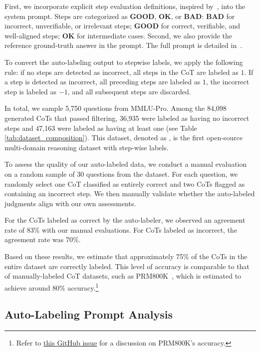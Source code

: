 First, we incorporate explicit step evaluation definitions,
inspired by~\citet{lightman2023let},
into the system prompt.
Steps are categorized as \textbf{GOOD},
\textbf{OK},
or \textbf{BAD}:
\textbf{BAD} for incorrect, unverifiable, or irrelevant steps;
\textbf{GOOD} for correct, verifiable, and well-aligned steps;
\textbf{OK} for intermediate cases.
Second, we also provide the reference ground-truth answer in the prompt.
The full prompt is detailed in~.


To convert the auto-labeling output to stepwise labels, we apply the following rule:
if no steps are detected as incorrect, all steps in the CoT are labeled as $1$.
If a step is detected as incorrect, all preceding steps are labeled as $1$, the incorrect step is labeled as $-1$,
and all subsequent steps are discarded.



In total, we sample 5,750 questions from MMLU-Pro. Among the 84,098 generated CoTs that passed filtering, 36,935 were labeled as having no incorrect steps and 47,163 were labeled as having at least one (see Table \ref{tab:dataset_composition}). This dataset, denoted as \emph{\ourdatatrain}, is the first open-source multi-domain reasoning dataset with step-wise labels.






To assess the quality of our auto-labeled data,
we conduct a manual evaluation on a random sample of 30 questions from the dataset.
For each question, we randomly select one CoT classified as entirely correct and two CoTs flagged as containing an incorrect step.
We then manually validate whether the auto-labeled judgments align with our own assessments.


For the CoTs labeled as correct by the auto-labeler, we observed an agreement rate of 83\% with our manual evaluations.
For CoTs labeled as incorrect, the agreement rate was 70\%.

Based on these results, we estimate that approximately 75\% of the CoTs in the entire dataset are correctly labeled.
This level of accuracy is comparable to that of manually-labeled CoT datasets,
such as PRM800K~\citep{lightman2023let},
which is estimated to achieve around 80\% accuracy.\footnote{Refer to \href{https://github.com/openai/prm800k/issues/12}{this GitHub issue} for a discussion on PRM800K's accuracy.}


\subsection{Auto-Labeling Prompt Analysis}
\label{sec:auto-analysis-ablate}


